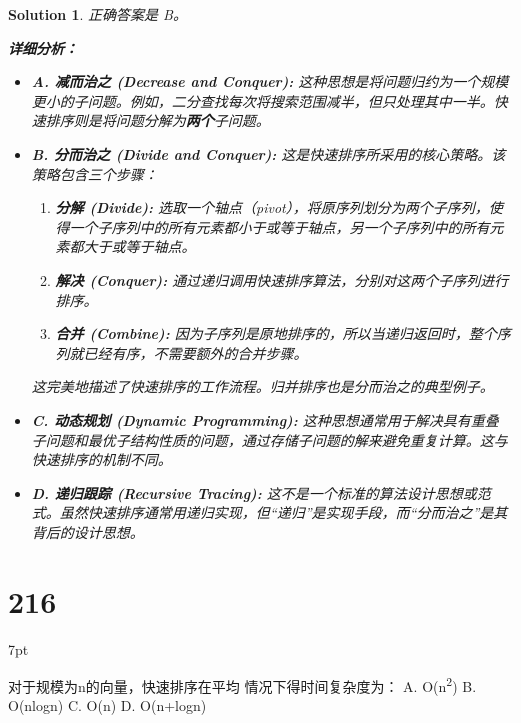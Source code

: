 \documentclass[UTF8]{report}
\newtheorem{solution}{Solution}
\theoremstyle{MyLineTheoremStyle} %
\theoremstyle{MyBlockTheoremStyle} %
\theoremstyle{MySubsubsectionStyle} %
\newenvironment{graybox}{%
        \def\FrameCommand{%
        \hspace{1pt}%
        {\color{gray}\small \vrule width 2pt}%
        {\color{graybox_color}\vrule width 4pt}%
        \colorbox{graybox_color}%
        }%
        \MakeFramed{\advance\hsize-\width\FrameRestore}%
        \noindent\hspace{-4.55pt}%
        \begin{adjustwidth}{}{7pt}%
        \vspace{2pt}\vspace{2pt}%
        }
        {%
        \vspace{2pt}\end{adjustwidth}\endMakeFramed%
        }
\begin{document}
\begin{solution}
正确答案是 B。

\textbf{详细分析：}

\begin{itemize}
    \item \textbf{A. 减而治之 (Decrease and Conquer):} 这种思想是将问题归约为一个规模更小的子问题。例如，二分查找每次将搜索范围减半，但只处理其中一半。快速排序则是将问题分解为\textbf{两个}子问题。

    \item \textbf{B. 分而治之 (Divide and Conquer):} 这是快速排序所采用的核心策略。该策略包含三个步骤：
    \begin{enumerate}
        \item \textbf{分解 (Divide):} 选取一个轴点（pivot），将原序列划分为两个子序列，使得一个子序列中的所有元素都小于或等于轴点，另一个子序列中的所有元素都大于或等于轴点。
        \item \textbf{解决 (Conquer):} 通过递归调用快速排序算法，分别对这两个子序列进行排序。
        \item \textbf{合并 (Combine):} 因为子序列是原地排序的，所以当递归返回时，整个序列就已经有序，不需要额外的合并步骤。
    \end{enumerate}
    这完美地描述了快速排序的工作流程。归并排序也是分而治之的典型例子。

    \item \textbf{C. 动态规划 (Dynamic Programming):} 这种思想通常用于解决具有重叠子问题和最优子结构性质的问题，通过存储子问题的解来避免重复计算。这与快速排序的机制不同。

    \item \textbf{D. 递归跟踪 (Recursive Tracing):} 这不是一个标准的算法设计思想或范式。虽然快速排序通常用递归实现，但“递归”是实现手段，而“分而治之”是其背后的设计思想。
\end{itemize}
\end{solution}


\section*{216}
\begin{graybox}
对于规模为n的向量，快速排序在平均
情况下得时间复杂度为：
A. O(n\textsuperscript{2})
B. O(nlogn)
C. O(n)
D. O(n+logn)
\end{graybox}
\end{document}
